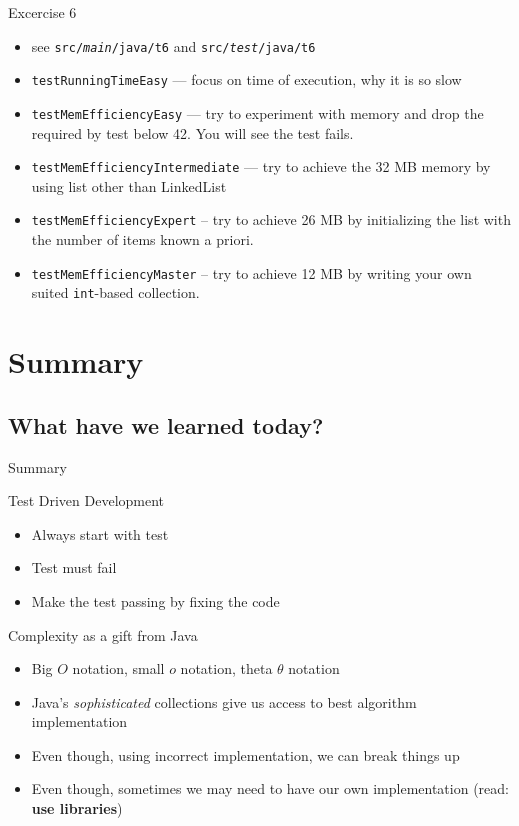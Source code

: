 \documentclass{beamer}
\begin{document}
\begin{frame}{Excercise 6}

\begin{itemize}
    \item see \texttt{src/\textit{main}/java/t6} and \texttt{src/\textit{test}/java/t6}
    \item \texttt{testRunningTimeEasy} --- focus on time of execution, why it is so slow \pause
    \item \texttt{testMemEfficiencyEasy} --- try to experiment with memory and drop the required by test below 42. You will see the test fails. \pause
    \item \texttt{testMemEfficiencyIntermediate} --- try to achieve the 32 MB memory by using list other than LinkedList \pause
    \item \texttt{testMemEfficiencyExpert} -- try to achieve 26 MB by initializing the list with the number of items known a priori. \pause
    \item \texttt{testMemEfficiencyMaster} -- try to achieve 12 MB by writing your own suited \texttt{int}-based collection.
\end{itemize}
\end{frame}

\section{Summary}
\subsection{What have we learned today?}

\begin{frame}[c]{ }
    \centering
    Summary
\end{frame}

\begin{frame}{Test Driven Development}

    \begin{itemize}
        \item Always start with test \pause
        \item Test must fail \pause
        \item Make the test passing by fixing the code \pause
    \end{itemize}
\end{frame}

\begin{frame}{Complexity as a gift from Java}

    \begin{itemize}
        \item Big $O$ notation, small $o$ notation, theta $\theta$ notation \pause
        \item Java's \textit{sophisticated} collections give us access to best algorithm implementation \pause
        \item Even though, using incorrect implementation, we can break things up \pause
        \item Even though, sometimes we may need to have our own implementation (read: \textbf{use libraries})
    \end{itemize}
\end{frame}
\end{document}
